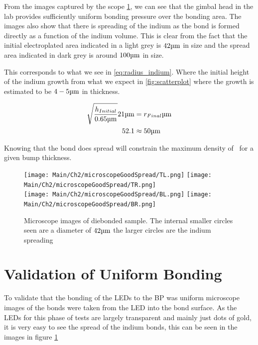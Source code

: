 From the images captured by the scope \ref{fig:microscopeIndium}, we can see that the gimbal head in the lab provides sufficiently uniform bonding pressure over the bonding area. The images also show that there is spreading of the indium as the bond is formed directly as a function of the indium volume. This is clear from the fact that the initial electroplated area indicated in a light grey is $42\um$ in size and the spread area indicated in dark grey is around $100 \um$ in size.

This corresponds to what we see in \ref{eq:radius_indium}. Where the initial height of the indium growth from what we expect in \ref{fig:scatterplot} where the growth is estimated to be $4-5\um$ in thickness.


\begin{equation} \label{eq:radius_indium2}
    \begin{split}
        \sqrt{\frac{h_{Initial}}{ 0.65 \um}} 21 \um &= r_{Final} \um \\
        52.1 &\approx 50 \um
    \end{split}
\end{equation}


Knowing that the bond does spread will constrain the maximum density of \uleds \ for a given bump thickness.

\begin{figure}
    \centering
    \texttt{[image: Main/Ch2/microscopeGoodSpread/TL.png]}
    \texttt{[image: Main/Ch2/microscopeGoodSpread/TR.png]} \\
    \texttt{[image: Main/Ch2/microscopeGoodSpread/BL.png]}
    \texttt{[image: Main/Ch2/microscopeGoodSpread/BR.png]}
    \caption{Microscope images of diebonded sample. The internal smaller circles seen are a diameter of $42 \um$ the larger circles are the indium spreading}
    \label{fig:microscopeIndium}
\end{figure}

\section{Validation of Uniform Bonding}
\label{sec:uniformBond}
To validate that the bonding of the LEDs to the BP was uniform microscope images of the bonds were taken from the LED into the bond surface. As the LEDs for this phase of tests are largely transparent and mainly just dots of gold, it is very easy to see the spread of the indium bonds, this can be seen in the images in figure \ref{fig:microscopeIndium}

